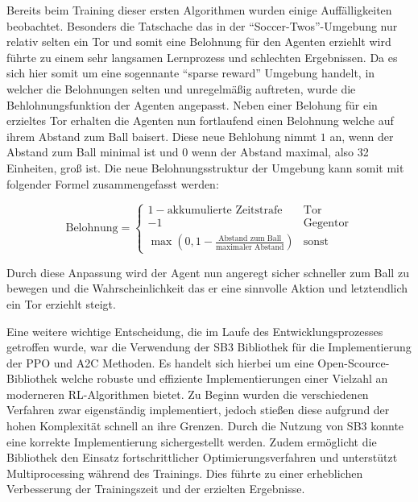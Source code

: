 \documentclass[twocolumn]{webofc}
\begin{document}
Bereits beim Training dieser ersten Algorithmen wurden einige Auffälligkeiten beobachtet. Besonders die Tatschache das in der \enquote{Soccer-Twos}-Umgebung nur relativ selten ein Tor und somit eine Belohnung für den Agenten erziehlt wird führte zu einem sehr langsamen Lernprozess und schlechten Ergebnissen. Da es sich hier somit um eine sogennante \enquote{sparse reward} Umgebung handelt, in welcher die Belohnungen selten und unregelmäßig auftreten, wurde die Behlohnungsfunktion der Agenten angepasst. Neben einer Belohung für ein erzieltes Tor erhalten die Agenten nun fortlaufend einen Belohnung welche auf ihrem Abstand zum Ball baisert. Diese neue Behlohung nimmt \(1\) an, wenn der Abstand zum Ball minimal ist und \(0\) wenn der Abstand maximal, also 32 Einheiten, groß ist. Die neue Belohnungsstruktur der Umgebung kann somit mit folgender Formel zusammengefasst werden:


\[
\text{Belohnung} = \begin{cases}
	1 - \text{akkumulierte Zeitstrafe} & \text{Tor} \\
	-1 & \text{Gegentor} \\
	\max\left(0, 1 - \frac{\text{Abstand zum Ball}}{\text{maximaler Abstand}}\right) & \text{sonst}
\end{cases}
\]

Durch diese Anpassung wird der Agent nun angeregt sicher schneller zum Ball zu bewegen und die Wahrscheinlichkeit das er eine sinnvolle Aktion und letztendlich ein Tor erziehlt steigt.

Eine weitere wichtige Entscheidung, die im Laufe des Entwicklungsprozesses getroffen wurde, war die Verwendung der \ac{SB3} Bibliothek \cite{stable-baselines3} für die Implementierung der \ac{PPO} und \ac{A2C} Methoden. Es handelt sich hierbei um eine Open-Scource-Bibliothek welche robuste und effiziente Implementierungen einer Vielzahl an moderneren \ac{RL}-Algorithmen bietet.
Zu Beginn wurden die verschiedenen Verfahren zwar eigenständig implementiert, jedoch stießen diese aufgrund der hohen Komplexität schnell an ihre Grenzen. Durch die Nutzung von \ac{SB3} konnte eine korrekte Implementierung sichergestellt werden. Zudem ermöglicht die Bibliothek den Einsatz fortschrittlicher Optimierungsverfahren und unterstützt Multiprocessing während des Trainings. Dies führte zu einer erheblichen Verbesserung der Trainingszeit und der erzielten Ergebnisse.
\end{document}

